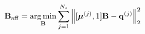 \documentclass[preview]{standalone}
\begin{document}
\begin{align*}
\special{dvisvgm:raw <g id='unique000'>}\mathbf B_{\rm aff}=\underset{\mathbf B}{\operatorname*{arg\,min}}\sum_{j=1}^{N_s}\left\|[\boldsymbol\mu^{(j)},1]\mathbf B-\mathbf q^{(j)}\right\|_2^2\special{dvisvgm:raw </g>}
\end{align*}
\end{document}
